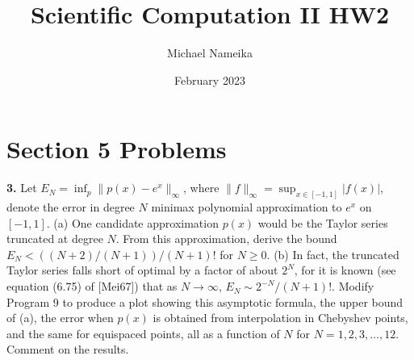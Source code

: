\documentclass{article}
\title{Scientific Computation II HW2}
\author{Michael Nameika}
\date{February 2023}
\begin{document}
\maketitle

\section*{Section 5 Problems}
\textbf{3.} Let $E_N = \inf_p\|p(x) - e^x\|_{\infty}$, where $\|f\|_{\infty} = \sup_{x \in [-1,1]}|f(x)|$, denote the error in degree $N$ minimax polynomial approximation to $e^x$ on $[-1,1]$. (a) One candidate approximation $p(x)$ would be the Taylor series truncated at degree $N$. From this approximation, derive the bound $E_N < ((N + 2)/(N+1))/(N+1)!$ for $N \geq 0$. (b) In fact, the truncated Taylor series falls short of optimal by a factor of about $2^N$, for it is known (see equation (6.75) of [Mei67]) that as $N \to \infty$, $E_N \sim 2^{-N}/(N+1)!$. Modify Program 9 to produce a plot showing this asymptotic formula, the upper bound of (a), the error when $p(x)$ is obtained from interpolation in Chebyshev points, and the same for equispaced points, all as a function of $N$ for $N = 1, 2,3, \dots, 12$. Comment on the results.
\newline\newline
\end{document}

